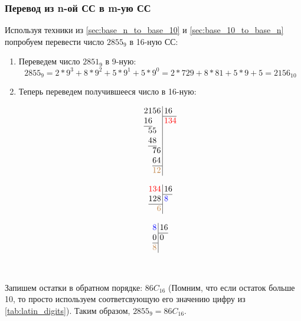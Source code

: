 \documentclass[12pt]{article}
\theoremstyle{problem_style}
\begin{document}
\subsubsection{Перевод из n-ой СС в m-ую СС}\label{sec:base_n_to_base_m}
Используя техники из \autoref{sec:base_n_to_base_10} и \autoref{sec:base_10_to_base_n} попробуем перевести число $2855_9$ в 16-ную СС:
\begin{enumerate}
    \item Переведем число $2851_9$ в 9-ную:
    \[2855_9 = 2 * 9^3 + 8 * 9^2 + 5 * 9^1 + 5 * 9^0 = 2 * 729 + 8 * 81 + 5 * 9 + 5 = 2156_{10}\]
    \item Теперь переведем получившееся число в 16-ную:
    \begin{figure}[h!]
    \begin{minipage}{0.18\linewidth}
    $$\arraycolsep=0.01em
    \begin{array}{rrrr@{\,}r|l}
    2&1&5&6&&\,16\\
    \cline{6-6}
    1&6&&&&\,\textcolor{red}{134}\\
    \cline{1-2}
    &5&5&&&\\
    &4&8&&&\\
    \cline{2-3}
    &&7&6&&\\
    &&6&4&&\\
    \cline{3-4}
    &&\textcolor{brown}{1}&\textcolor{brown}{2}&&\\
    \end{array}$$
    \end{minipage}
    \hspace{1cm}
    \begin{minipage}{0.18\linewidth}
    $$\arraycolsep=0.01em
    \begin{array}{rrr@{\,}r|l}
    \textcolor{red}{1}&\textcolor{red}{3}&\textcolor{red}{4}&&\,16\\
    \cline{5-5}
    1&2&8&&\,\textcolor{blue}{8}\\
    \cline{1-3}
    &&\textcolor{brown}{6}&&\\
    \end{array}$$
    \end{minipage}
    \hspace{1cm}
    \begin{minipage}{0.18\linewidth}
    $$\arraycolsep=0.01em
    \begin{array}{r@{\,}r|l}
    \textcolor{blue}{8}&&\,16\\
    \cline{3-3}
    0&&\,0\\
    \cline{1-1}
    \textcolor{brown}{8}&&\\
    \end{array}$$
    \end{minipage}
\end{figure}\\
\end{enumerate}
Запишем остатки в обратном порядке: $86C_{16}$ (Помним, что если остаток больше 10, то просто используем соответсвующую его значению цифру из \autoref{tab:latin_digits}). Таким образом, $2855_9 = 86C_{16}$.
\end{document}

